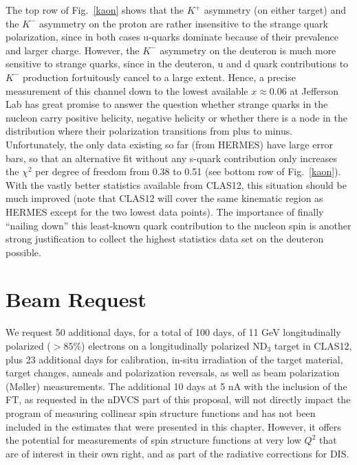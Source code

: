The top row of Fig.~\ref{kaon} shows that the $K^+$ asymmetry (on either target) and the $K^-$ asymmetry on the proton are rather insensitive
to the strange quark polarization, since in both cases u-quarks dominate because of their prevalence and larger charge.
However, the $K^-$ asymmetry on the deuteron is much more sensitive to strange quarks, since in the deuteron,
u and d quark contributions to $K^-$  production fortuitously cancel to a large extent. Hence, a precise measurement of
this channel down to the lowest available $x \approx 0.06$ at Jefferson Lab has great promise to answer the question whether
strange quarks in the nucleon carry positive helicity, negative helicity or whether there is a node in the distribution where
their polarization transitions from plus to minus.
Unfortunately, the only data existing so far (from HERMES) have large error bars, so that an alternative fit without any
s-quark contribution only increases the $\chi^2$ per degree of freedom from 0.38 to 0.51 (see bottom row of Fig.~\ref{kaon}).
With the vastly better statistics available from CLAS12, this situation should be much improved (note that CLAS12
will cover the same kinematic region as HERMES except for the two lowest data points). The importance of
finally ``nailing down'' this least-known quark contribution to the nucleon spin is another strong justification to collect
the highest statistics data set on the deuteron possible.

\section{Beam Request}

We request 50 additional days, for a total of 100 days, of 11 GeV longitudinally polarized ($> 85 \%$) electrons on a longitudinally polarized ND$_3$ target in CLAS12, plus 23 additional days for calibration, in-situ irradiation of the target material, target changes, anneals and polarization reversals, as well as beam polarization (M\o ller) measurements. 
The additional 10 days at 5 nA with the inclusion of the FT, as requested in the nDVCS part of this proposal, will not directly impact the program of measuring collinear spin structure functions and has not been included in the estimates that were presented in this chapter. However, it offers the potential for measurements of spin structure functions at very low $Q^2$ that are of interest in their own right, and as part of the radiative corrections for DIS.
